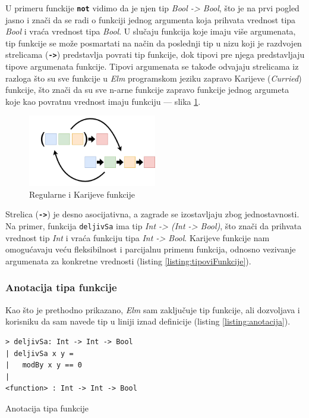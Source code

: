 \documentclass[12pt,oneside]{memoir}
\begin{document}
U primeru funckije \texttt{\textbf{not}} vidimo da je njen tip \emph{Bool -> Bool},
što je na prvi pogled jasno i znači da se radi o funkciji jednog argumenta koja
prihvata vrednost tipa \emph{Bool} i vraća vrednost tipa \emph{Bool}. U slučaju
funkcija koje imaju više argumenata, tip funkcije se može
posmartati na način da poslednji tip u nizu koji je razdvojen strelicama
(\texttt{\textbf{->}}) predstavlja povrati tip funkcije, dok tipovi pre njega 
predstavljaju tipove argumenata funkcije. Tipovi argumenata se takođe odvajaju strelicama
iz razloga što su sve funkcije u \emph{Elm} programskom jeziku zapravo Karijeve (\emph{Curried}) funkcije,
što znači da su sve n-arne funkcije zapravo funkcije jednog argumeta
koje kao povratnu vrednost imaju funkciju --- slika \ref{fig:currying}.
\begin{figure}[!h]
  \centering
  \includegraphics[width=0.5\textwidth]{currying.png}
  \caption{Regularne i Karijeve funkcije}
  \label{fig:currying}
\end{figure}
Strelica (\texttt{\textbf{->}}) je desno asocijativna, a zagrade se izostavljaju zbog
jednostavnosti. Na primer, funkcija \texttt{deljivSa} ima tip \emph{Int -> (Int -> Bool)},
što znači da prihvata vrednost tip \emph{Int} i vraća funkciju tipa \emph{Int -> Bool}.
Karijeve funkcije nam omogućavaju veću fleksibilnost i parcijalnu primenu funkcija, 
odnosno vezivanje argumenata za konkretne vrednosti (listing \ref{listing:tipoviFunkcije}).

\subsubsection{Anotacija tipa funkcije}
Kao što je prethodno prikazano, \emph{Elm} sam zaključuje tip funkcije, ali dozvoljava i korisniku
da sam navede tip u liniji iznad definicije (listing \ref{listing:anotacija}).
\begin{listing}[!h]
\begin{verbatim}
> deljivSa: Int -> Int -> Bool
| deljivSa x y =
|   modBy x y == 0
|
<function> : Int -> Int -> Bool
\end{verbatim}
\caption{Anotacija tipa funkcije}
\label{listing:anotacija}
\end{listing}
\end{document}
